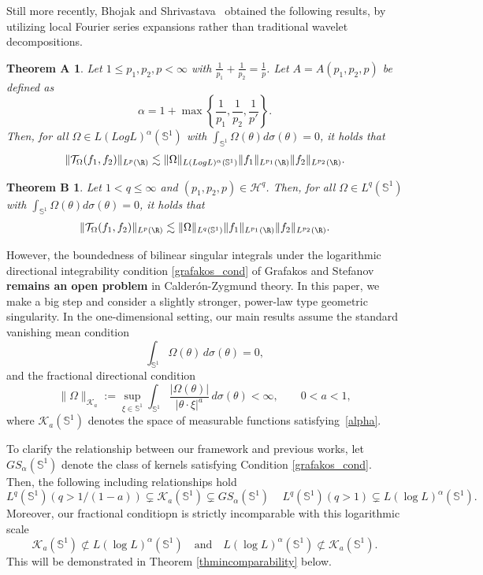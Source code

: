 \documentclass[11pt]{amsart}
\newtheorem*{thA}{Theorem A}
\newtheorem*{thB}{Theorem B}
\begin{document}
Still more recently, Bhojak and Shrivastava~\cite{bhojak2025alternate} obtained the following results, by utilizing local Fourier series expansions rather than traditional wavelet decompositions.  \begin{thA}\label{Thm:RoughBanach}
	Let $1\leq p_1,p_2,p<\infty$ with $\frac{1}{p_1}+\frac{1}{p_2}=\frac{1}{p}$. Let $A=A(p_1,p_2,p)$ be defined as
	\[\alpha=1+\max\left\{\frac{1}{p_1},\frac{1}{p_2},\frac{1}{p'}\right\}.\]
	Then, for all $\Omega\in L(LogL)^{\alpha}(\mathbb{S}^{1})$ with $\int_{\mathbb{S}^{1}}\Omega(\theta) d\sigma(\theta)=0$, it holds that
	\[\|\mathcal {T}_\Omega(f_1,f_2)\|_{L^{p}(\R)}\lesssim\|\Omega\|_{L(LogL)^{\alpha}(\mathbb{S}^{1})}\|f_1\|_{L^{p_1}(\R)}\|f_2\|_{L^{p_2}(\R)}.\]
\end{thA}
\begin{thB}
	Let $1<q\leq\infty$ and $(p_1,p_2,p)\in\mathcal{H}^q$. Then, for all $\Omega\in L^q(\mathbb{S}^{1})$ with $\int_{\mathbb{S}^{1}}\Omega(\theta) d\sigma(\theta)=0$, it holds that
\[\|\mathcal {T}_\Omega(f_1,f_2)\|_{L^p(\R)}\lesssim\|\Omega\|_{L^q(\mathbb{S}^{1})}\|f_1\|_{L^{p_1}(\R)}\|f_2\|_{L^{p_2}(\R)}.\]
\end{thB}
However, the boundedness of bilinear singular integrals under the logarithmic directional integrability condition \eqref{grafakos_cond} of Grafakos and Stefanov \textbf{remains an open problem} in Calder\'on-Zygmund theory. In this paper, we make a big step and consider a slightly stronger, power-law type geometric singularity. In the one-dimensional setting, our main results assume the standard vanishing mean condition
\begin{equation}\label{cancellation}
\int_{\mathbb{S}^{1}} \Omega(\theta) \, d\sigma(\theta) = 0,
\end{equation}
and the fractional directional condition
\begin{equation}\label{alpha}
\|\Omega\|_{\mathcal{K}_a} := \sup_{\xi \in \mathbb{S}^{1}} \int_{\mathbb{S}^{1}} \frac{|\Omega(\theta)|}{|\theta \cdot \xi|^{a}} \, d\sigma(\theta) < \infty,\qquad 0<a<1,
\end{equation}
where $\mathcal{K}_a(\mathbb{S}^{1})$ denotes the space of measurable functions satisfying~\eqref{alpha}. 


To clarify the relationship between our framework and previous works, let $GS_\alpha(\mathbb{S}^{1})$ denote the class of kernels satisfying Condition \eqref{grafakos_cond}.  Then, the following including relationships hold
\[
L^q(\mathbb{S}^1) (q>1/(1-a))\subsetneq
\mathcal{K}_a(\mathbb{S}^{1})\subsetneq GS_\alpha(\mathbb{S}^{1})\, \quad
L^q(\mathbb{S}^1) (q>1)\subsetneq L(\log L)^\alpha(\mathbb{S}^1).
\]
Moreover, our fractional conditiopn is strictly incomparable with this logarithmic scale
\[
\mathcal{K}_a(\mathbb{S}^1) \not\subset L(\log L)^\alpha(\mathbb{S}^1) \quad \text{and} \quad L(\log L)^\alpha(\mathbb{S}^1) \not\subset \mathcal{K}_a(\mathbb{S}^1).
\]This will be demonstrated in Theorem \ref{thmincomparability} below.
\end{document}
